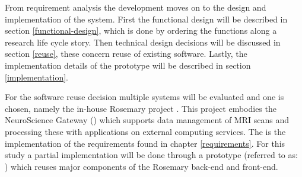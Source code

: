 
From requirement analysis the development moves on to the design and implementation of the system.
First the functional design will be described in section \ref{functional-design}, which is done by ordering the functions along a research life cycle story.
Then technical design decisions will be discussed in section \ref{reuse}, these concern reuse of existing software.
Lastly, the implementation details of the \ivfsystem{} prototype will be described in section \ref{implementation}.

For the software reuse decision multiple systems will be evaluated and one is chosen, namely the in-house Rosemary project \cite{rosemary}.
This project embodies the NeuroScience Gateway (\nsg{}) \cite{shahand2015data} which supports data management of MRI scans and processing these with applications on external computing services.
The \ivfsystem{} is the implementation of the requirements found in chapter \ref{requirements}.
For this study a partial implementation will be done through a prototype (referred to as: \ivfprototype{}) which reuses major components of the Rosemary back-end and front-end.